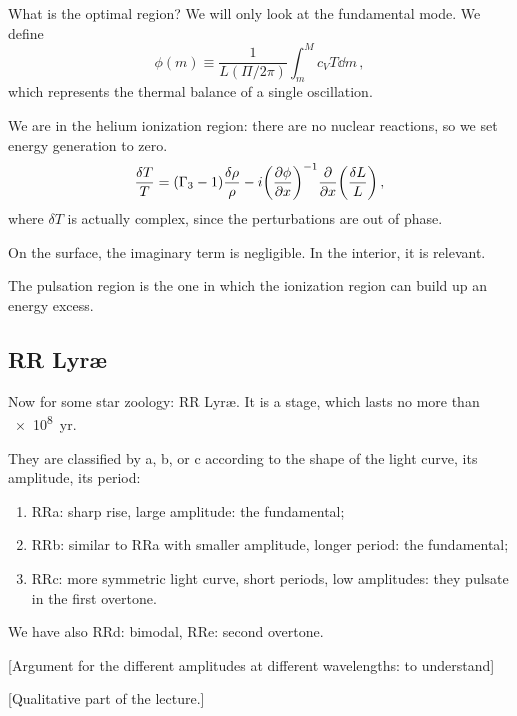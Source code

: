 \documentclass[main.tex]{subfiles}
\begin{document}
What is the optimal region? We will only look  at the fundamental mode. We define
%
\begin{equation}
  \phi (m) \equiv \frac{1}{L(\Pi / 2 \pi )}\int_m^M c_V T \dd{m} 
\,,
\end{equation}
%
which represents the thermal balance of a single oscillation.

We are in the helium ionization region: there are no nuclear reactions, so we set energy generation to zero. 
%
\begin{equation}
  \frac{\delta T}{T} = (\Gamma_3 -1 ) \frac{\delta \rho }{\rho } - i \qty(\pdv{\phi }{x} )^{-1} \pdv{}{x} \qty(\frac{\delta L}{L})
\,,
\end{equation}
%
where \(\delta T\) is actually complex, since the perturbations are out of phase.

On the surface, the imaginary term is negligible. In the interior, it is relevant.

The pulsation region is the one in which the ionization region can build up an energy excess. 

\subsection{RR Lyr\ae}

Now for some star zoology: RR Lyr\ae.
It is a stage, which lasts no more than \SI{e8}{yr}.

They are classified by a, b, or c according to the shape of the light curve, its amplitude, its period:

\begin{enumerate}
  \item RRa: sharp rise, large amplitude: the fundamental;
  \item RRb: similar to RRa with smaller amplitude, longer period: the fundamental;
  \item RRc: more symmetric light curve, short periods, low amplitudes: they pulsate in the first overtone.
\end{enumerate}

We have also RRd: bimodal, RRe: second overtone.

[Argument for the different amplitudes at different wavelengths: to understand]

[Qualitative part of the lecture.]
\end{document}
